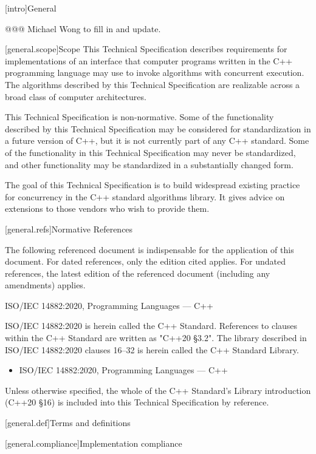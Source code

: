 
[intro]{General}

@@@ Michael Wong to fill in and update.

[general.scope]{Scope}
\pnum
This Technical Specification describes requirements for implementations of an interface that computer programs written in the C++ programming language may use to invoke algorithms with concurrent execution. The algorithms described by this Technical Specification are realizable across a broad class of computer architectures.

\pnum
This Technical Specification is non-normative. Some of the functionality described by this Technical Specification may be considered for standardization in a future version of C++, but it is not currently part of any C++ standard. Some of the functionality in this Technical Specification may never be standardized, and other functionality may be standardized in a substantially changed form.

\pnum
The goal of this Technical Specification is to build widespread existing practice for concurrency in the C++ standard algorithms library. It gives advice on extensions to those vendors who wish to provide them.

[general.refs]{Normative References}
\pnum

The following referenced document is indispensable for the application of this document. For dated references, only the edition cited applies. For undated references, the latest edition of the referenced document (including any amendments) applies.

ISO/IEC 14882:2020, Programming Languages — C++
\pnum

ISO/IEC 14882:2020 is herein called the C++ Standard. References to clauses within the C++ Standard are written as "C++20 §3.2". The library described in ISO/IEC 14882:2020 clauses 16–32 is herein called the C++ Standard Library.
\pnum

\begin{itemize}
\item {ISO/IEC 14882:2020, Programming Languages --- C++}
\end{itemize}

Unless otherwise specified, the whole of the C++ Standard's Library introduction (C++20 §16) is included into this Technical Specification by reference.


[general.def]{Terms and definitions}

[general.compliance]{Implementation compliance}

